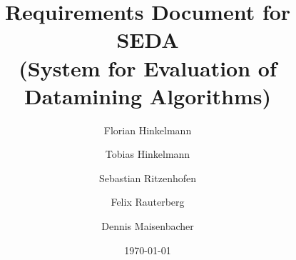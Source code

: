 \documentclass{book}
\title{Requirements Document for\\
 SEDA\\
(System for Evaluation of Datamining Algorithms)  }
\author{Florian Hinkelmann \and Tobias Hinkelmann \and Sebastian Ritzenhofen \and Felix Rauterberg \and Dennis Maisenbacher}
\date{\today}
\begin{document}

\maketitle


\printglossaries

\tableofcontents




\end{document}
